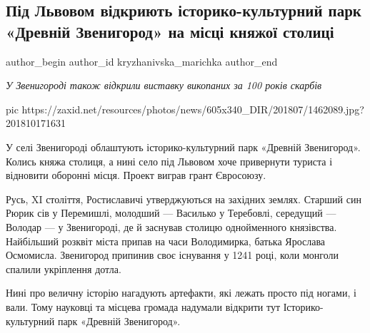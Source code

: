  
 
 
 
 
 
\subsection{Під Львовом відкриють історико-культурний парк «Древній Звенигород» на місці княжої столиці}
\label{sec:23_07_2018.news.ua.zaxid_net.kryzhanivska_marichka.1.zvenygorod}
\ifcmt
  author_begin
   author_id kryzhanivska_marichka
  author_end
\fi


\emph{У Звенигороді також відкрили виставку викопаних за 100 років скарбів}

\ifcmt
pic https://zaxid.net/resources/photos/news/605x340_DIR/201807/1462089.jpg?201810171631
\fi

У селі Звенигороді облаштують історико-культурний парк «Древній Звенигород».
Колись княжа столиця, а нині село під Львовом хоче привернути туриста і
відновити оборонні місця. Проект виграв грант Євросоюзу.

Русь, XI століття, Ростиславичі утверджуються на західних землях. Старший син
Рюрик сів у Перемишлі, молодший — Василько у Теребовлі, середущий — Володар — у
Звенигороді, де й заснував столицю однойменного князівства. Найбільший розквіт
міста припав на часи Володимирка, батька Ярослава Осмомисла. Звенигород
припинив своє існування у 1241 році, коли монголи спалили укріплення дотла.

Нині про величну історію нагадують артефакти, які лежать просто під ногами, і
вали. Тому науковці та місцева громада надумали відкрити тут
Історико-культурний парк «Древній Звенигород».

